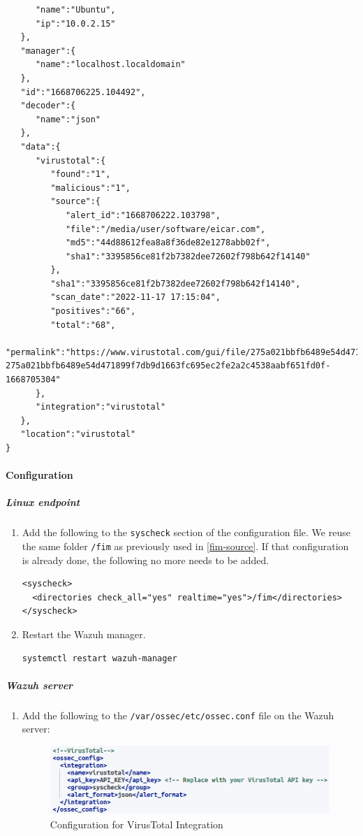 \begin{enumerate}
\begin{itemize}
\begin{verbatim}
      "name":"Ubuntu",
      "ip":"10.0.2.15"
   },
   "manager":{
      "name":"localhost.localdomain"
   },
   "id":"1668706225.104492",
   "decoder":{
      "name":"json"
   },
   "data":{
      "virustotal":{
         "found":"1",
         "malicious":"1",
         "source":{
            "alert_id":"1668706222.103798",
            "file":"/media/user/software/eicar.com",
            "md5":"44d88612fea8a8f36de82e1278abb02f",
            "sha1":"3395856ce81f2b7382dee72602f798b642f14140"
         },
         "sha1":"3395856ce81f2b7382dee72602f798b642f14140",
         "scan_date":"2022-11-17 17:15:04",
         "positives":"66",
         "total":"68",
         "permalink":"https://www.virustotal.com/gui/file/275a021bbfb6489e54d471899f7db9d1663fc695ec2fe2a2c4538aabf651fd0f/detection/f-275a021bbfb6489e54d471899f7db9d1663fc695ec2fe2a2c4538aabf651fd0f-1668705304"
      },
      "integration":"virustotal"
   },
   "location":"virustotal"
}
    \end{verbatim}
    \end{itemize}
\end{enumerate}

\paragraph{Configuration}
\subparagraph{Linux endpoint}
\begin{enumerate}
    \item Add the following to the \texttt{\textlangle syscheck\textrangle} section of the configuration file. We reuse the same folder \texttt{/fim} as previously used in \ref{fim-source}. If that configuration is already done, the following no more needs to be added.
    \begin{verbatim}
<syscheck>
  <directories check_all="yes" realtime="yes">/fim</directories>
</syscheck>
    \end{verbatim}

    \item Restart the Wazuh manager.
    \begin{verbatim}
systemctl restart wazuh-manager
    \end{verbatim}
\end{enumerate}

\subparagraph{Wazuh server}
\begin{enumerate}
    \item Add the following to the \texttt{/var/ossec/etc/ossec.conf} file on the Wazuh server:
    \begin{figure}[H]
        \centering
        \includegraphics[width=\textwidth]{images/malware-detection/virustotal/1.png}
        \caption{Configuration for VirusTotal Integration}
        \label{fig:virustotal-conf}
    \end{figure}
\end{enumerate}

